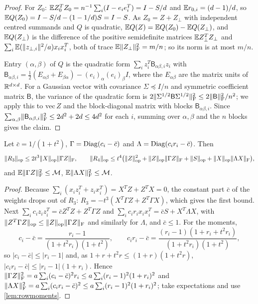 \begin{proof}
For $Z_0$: $\mathbb E Z_0^TZ_0=n^{-1}\sum_i(I-e_ie_i^T)=I-S/d$ and $\mathbb E r_{0,i}=(d-1)/d$,
so $\mathbb E Q(Z_0)=I-S/d-(1-1/d)S=I-S$. As $Z_0=Z+Z_\perp$ with independent centred
summands and $Q$ is quadratic, $\mathbb E Q(Z)=\mathbb E Q(Z_0)-\mathbb E Q(Z_\perp)$, and
$\mathbb E Q(Z_\perp)$ is the difference of the positive semidefinite matrices
$\mathbb E Z_\perp^TZ_\perp$ and $\sum_i\mathbb E(\lVert z_{\perp,i}\rVert^2/a)x_ix_i^T$, both of trace
$\mathbb E\lVert Z_\perp\rVert_{\mathrm F}^2=m/n$; so its norm is at most $m/n$.

Entry $(\alpha,\beta)$ of $Q$ is the quadratic form $\sum_iz_i^T\mathsf B_{\alpha\beta,i}z_i$
with $\mathsf B_{\alpha\beta,i}=\frac12(E_{\alpha\beta}+E_{\beta\alpha})-(e_i)_\alpha(e_i)_\beta I$, where the $E_{\alpha\beta}$ are the matrix units of $\mathbb R^{d\times d}$.
For a Gaussian vector with covariance $\Sigma\preceq I/n$ and symmetric
coefficient matrix $\mathsf B$, the variance of the quadratic form is
$2\lVert \Sigma^{1/2}\mathsf B\Sigma^{1/2}\rVert_{\mathrm F}^2\le2\lVert \mathsf B\rVert_{\mathrm F}^2/n^2$; we apply
this to $\mathrm{vec}\,Z$ and the block-diagonal matrix with blocks
$\mathsf B_{\alpha\beta,i}$. Since
$\sum_{\alpha,\beta}\lVert \mathsf B_{\alpha\beta,i}\rVert_{\mathrm F}^2\le2d^2+2d\le4d^2$ for each $i$,
summing over $\alpha,\beta$ and the $n$ blocks gives the claim.
\end{proof}

\begin{lemma}[Remainder]\label{lem:remainder}
Let $\bar c=1/(1+t^2)$, $\Gamma=\operatorname{Diag}(c_i-\bar c)$ and
$\Lambda=\operatorname{Diag}(c_ir_i-\bar c)$. Then
\[
 \lVert R_3\rVert_{\mathrm{op}}\le2t^3\lVert X\rVert_{\mathrm{op}}\lVert \Gamma Z\rVert_{\mathrm F},\qquad
 \lVert R_4\rVert_{\mathrm{op}}\le t^4\bigl(\lVert Z\rVert_{\mathrm{op}}^2+\lVert Z\rVert_{\mathrm{op}}\lVert \Gamma Z\rVert_{\mathrm F}+\lVert S\rVert_{\mathrm{op}}+\lVert X\rVert_{\mathrm{op}}\lVert \Lambda X\rVert_{\mathrm F}\bigr),
\]
and $\mathbb E\lVert \Gamma Z\rVert_{\mathrm F}^2\le\mathcal M$, $\mathbb E\lVert \Lambda X\rVert_{\mathrm F}^2\le\mathcal M$.
\end{lemma}

\begin{proof}
Because $\sum_i(x_iz_i^T+z_ix_i^T)=X^TZ+Z^TX=0$, the constant part $\bar c$ of
the weights drops out of $R_3$:
$R_3=-t^3(X^T\Gamma Z+Z^T\Gamma X)$, which gives the first bound. Next
$\sum_ic_iz_iz_i^T=\bar cZ^TZ+Z^T\Gamma Z$ and $\sum_ic_ir_ix_ix_i^T=\bar cS+X^T\Lambda X$,
with $\lVert Z^T\Gamma Z\rVert_{\mathrm{op}}\le\lVert Z\rVert_{\mathrm{op}}\lVert \Gamma Z\rVert_{\mathrm F}$ and similarly for $\Lambda$, and
$\bar c\le1$. For the moments,
\[
 c_i-\bar c=\frac{r_i-1}{(1+t^2r_i)(1+t^2)},\qquad
 c_ir_i-\bar c=\frac{(r_i-1)(1+r_i+t^2r_i)}{(1+t^2r_i)(1+t^2)},
\]
so $|c_i-\bar c|\le|r_i-1|$ and, as $1+r+t^2r\le(1+r)(1+t^2r)$,
$|c_ir_i-\bar c|\le|r_i-1|(1+r_i)$. Hence
$\lVert \Gamma Z\rVert_{\mathrm F}^2=a\sum_i(c_i-\bar c)^2r_i\le a\sum_i(r_i-1)^2(1+r_i)^2$ and
$\lVert \Lambda X\rVert_{\mathrm F}^2=a\sum_i(c_ir_i-\bar c)^2\le a\sum_i(r_i-1)^2(1+r_i)^2$; take
expectations and use \cref{lem:rowmoments}.
\end{proof}

